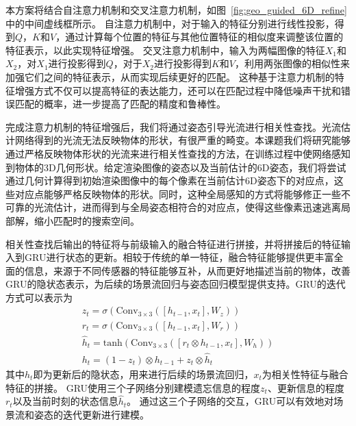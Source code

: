 \documentclass[12pt]{article}
\begin{document}
本方案将结合自注意力机制和交叉注意力机制，如图~\ref{fig:geo_guided_6D_refine}中的中间虚线框所示。
自注意力机制中，对于输入的特征分别进行线性投影，得到$Q$，$K$和$V$，通过计算每个位置的特征与其他位置特征的相似度来调整该位置的特征表示，以此实现特征增强。
交叉注意力机制中，输入为两幅图像的特征$X_1$和$X_2$，对$X_1$进行投影得到$Q$，对于$X_2$进行投影得到$K$和$V$，利用两张图像的相似性来加强它们之间的特征表示，从而实现后续更好的匹配。
这种基于注意力机制的特征增强方式不仅可以提高特征的表达能力，还可以在匹配过程中降低噪声干扰和错误匹配的概率，进一步提高了匹配的精度和鲁棒性。

完成注意力机制的特征增强后，我们将通过姿态引导光流进行相关性查找。光流估计网络得到的光流无法反映物体的形状，有很严重的畸变。本课题我们将研究能够通过严格反映物体形状的光流来进行相关性查找的方法，在训练过程中使网络感知到物体的3D几何形状。给定渲染图像的姿态以及当前估计的6D姿态，我们将尝试通过几何计算得到初始渲染图像中的每个像素在当前估计6D姿态下的对应点，这些对应点能够严格反映物体的形状。同时，这种全局感知的方式将能够修正一些不可靠的光流估计，进而得到与全局姿态相符合的对应点，使得这些像素迅速逃离局部解，缩小匹配时的搜索空间。



相关性查找后输出的特征将与前级输入的融合特征进行拼接，并将拼接后的特征输入到GRU进行状态的更新。相较于传统的单一特征，融合特征能够提供更丰富全面的信息，来源于不同传感器的特征能够互补，从而更好地描述当前的物体，改善GRU的隐状态表示，为后续的场景流回归与姿态回归模型提供支持。GRU的迭代方式可以表示为
\begin{gather}
        z_t = \sigma(\mathrm{Conv}_{3\times3}([h_{t-1}, x_t], W_z)) \\
        r_t = \sigma(\mathrm{Conv}_{3\times3}([h_{t-1}, x_t], W_r)) \\
        \hat{h}_t = \mathrm{tanh}(\mathrm{Conv}_{3\times3}([r_t \otimes h_{t-1}, x_t], W_h)) \\
        h_t = (1 - z_t)\otimes h_{t-1} + z_t \otimes \hat{h}_t
\end{gather}
其中$h_t$即为更新后的隐状态，用来进行后续的场景流回归，$x_t$为相关性特征与融合特征的拼接。
GRU使用三个子网络分别建模遗忘信息的程度$z_t$、更新信息的程度$r_t$以及当前时刻的状态信息$\hat{h}_t$。
通过这三个子网络的交互，GRU可以有效地对场景流和姿态的迭代更新进行建模。
\end{document}
